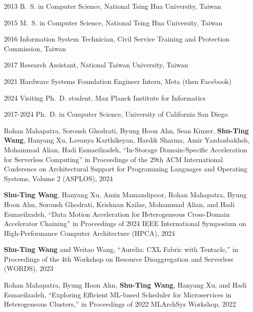\begin{frontmatter}
%
%
\begin{vitapage}
\begin{vita}
  \item[2013] B.~S. in Computer Science, National Tsing Hua University, Taiwan
  \item[2015] M.~S. in Computer Science, National Tsing Hua University, Taiwan
  \item[2016] Information System Technician, Civil Service Training and Protection Commission, Taiwan 
  \item[2017] Research Assistant, National Taiwan University, Taiwan
  \item[2021] Hardware Systems Foundation Engineer Intern, Meta (then Facebook)
  \item[2024] Visiting Ph.~D. student, Max Planck Institute for Informatics
  \item[2017-2024] Ph.~D. in Computer Science, University of California San Diego
\end{vita}
\begin{publications}
  \item Rohan Mahapatra, Soroush Ghodrati, Byung Hoon Ahn, Sean Kinzer, \textbf{Shu-Ting Wang}, Hanyang Xu,  Lavanya Karthikeyan, Hardik Sharma,  Amir Yazdanbakhsh,  Mohammad Alian, Hadi Esmaeilzadeh, “In-Storage Domain-Specific Acceleration for Serverless Computing” in Proceedings of the 29th ACM International Conference on Architectural Support for Programming Languages and Operating Systems, Volume 2 (ASPLOS), 2024
  \item \textbf{Shu-Ting Wang}, Hanyang Xu, Amin Mamandipoor, Rohan Mahapatra, Byung Hoon Ahn, Soroush Ghodrati, Krishnan Kailas, Mohammad Alian, and Hadi Esmaeilzadeh, “Data Motion Acceleration for Heterogeneous Cross-Domain Accelerator Chaining” in Proceedings of 2024 IEEE International Symposium on High-Performance Computer Architecture (HPCA), 2024
  \item \textbf{Shu-Ting Wang} and Weitao Wang, “Aurelia: CXL Fabric with Tentacle,” in Proceedings of the 4th Workshop on Resource Disaggregation and Serverless (WORDS), 2023
  \item Rohan Mahapatra, Byung Hoon Ahn, \textbf{Shu-Ting Wang}, Hanyang Xu, and Hadi Esmaeilzadeh, “Exploring Eﬀicient ML-based Scheduler for Microservices in Heterogeneous Clusters,” in Proceedings of 2022 MLArchSys Workshop, 2022
\end{publications}
\end{vitapage}



\end{frontmatter}

